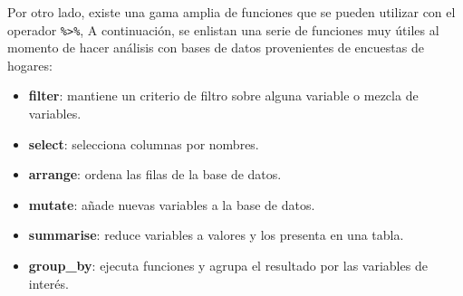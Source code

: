 \documentclass[
  spanish,
  12pt,
]{book}
\newenvironment{Shaded}{\begin{snugshade}}{\end{snugshade}}
\newcommand{\AttributeTok}[1]{\textcolor[rgb]{0.13,0.29,0.53}{#1}}
\newcommand{\DecValTok}[1]{\textcolor[rgb]{0.00,0.00,0.81}{#1}}
\newcommand{\FunctionTok}[1]{\textcolor[rgb]{0.13,0.29,0.53}{\textbf{#1}}}
\newcommand{\NormalTok}[1]{#1}
\newcommand{\OtherTok}[1]{\textcolor[rgb]{0.56,0.35,0.01}{#1}}
\newcommand{\SpecialCharTok}[1]{\textcolor[rgb]{0.81,0.36,0.00}{\textbf{#1}}}
\newcommand{\StringTok}[1]{\textcolor[rgb]{0.31,0.60,0.02}{#1}}
\providecommand{\tightlist}{%
  \setlength{\itemsep}{0pt}\setlength{\parskip}{0pt}}
\begin{document}
\begin{Shaded}
\end{Shaded}

Por otro lado, existe una gama amplia de funciones que se pueden utilizar con el operador \texttt{\%\textgreater{}\%}, A continuación, se enlistan una serie de funciones muy útiles al momento de hacer análisis con bases de datos provenientes de encuestas de hogares:

\begin{itemize}
\tightlist
\item
  \textbf{filter}: mantiene un criterio de filtro sobre alguna variable o mezcla de variables.
\item
  \textbf{select}: selecciona columnas por nombres.
\item
  \textbf{arrange}: ordena las filas de la base de datos.
\item
  \textbf{mutate}: añade nuevas variables a la base de datos.
\item
  \textbf{summarise}: reduce variables a valores y los presenta en una tabla.
\item
  \textbf{group\_by}: ejecuta funciones y agrupa el resultado por las variables de interés.
\end{itemize}
\end{document}
